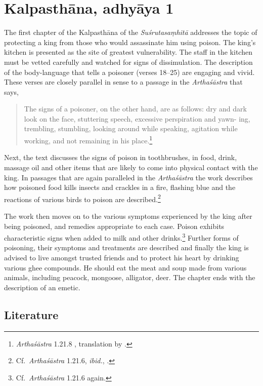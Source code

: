 \section{Kalpasthāna, adhyāya 1}

The first chapter of the Kalpasthāna of the \emph{Suśrutasaṃhitā} addresses the 
topic of protecting a king from those who would assassinate him using poison.  
The king's kitchen is presented as the site of greatest vulnerability.  The staff in 
the kitchen must be vetted carefully and watched for signs of dissimulation.  The 
description of the body-language that tells a poisoner (verses 18--25) are 
engaging and vivid.  These verses are closely parallel in sense to a passage in the 
\emph{Arthaśāstra} that says, 
\begin{quote}
    The signs of a poisoner, on the other hand, are as follows: dry and
    dark look on the face, stuttering speech, excessive perspiration and yawn-
    ing, trembling, stumbling, looking around while speaking, agitation while
    working, and not remaining in his place.\footnote{\emph{Arthaśāstra} 1.21.8 
    \citep[1, 30]{kang-1969}, 
    translation by \citet[97]{oliv-2013}.}
\end{quote}

Next, the text discusses the signs of poison in toothbrushes, in food, drink,
massage oil and other items that are likely to come into physical contact with the
king.  In passages that are again paralleled in the \emph{Arthaśāstra} the work
describes how poisoned food kills insects and crackles in a fire, flashing blue
and  the reactions of various birds to poison are described.\footnote{Cf.\
\emph{Arthaśāstra} 1.21.6, \emph{ibid.}, \citet[96]{oliv-2013}.}


The work then moves on to the various symptoms experienced by the king after 
being poisoned, and remedies appropriate to each case.  Poison exhibits 
characteristic signs when added to milk and other drinks.\footnote{Cf.\
\emph{Arthaśāstra} 1.21.6 again.} Further forms of poisoning, their symptoms 
and treatments are described  and finally the king is advised to live amongst 
trusted friends and to protect his heart by drinking various ghee compounds.  He 
should eat the meat and soup made from various animals, including peacock, 
mongoose, alligator, deer.  The chapter ends with the description of an emetic.

\subsection{Literature}


